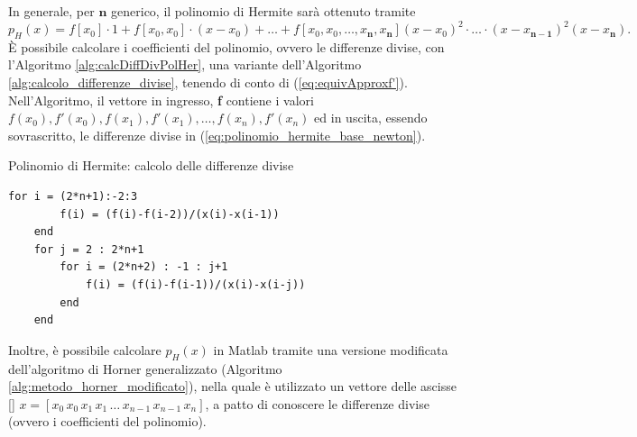 \begin{remark}
    In generale, per $\boldsymbol n$ generico, il polinomio di Hermite sarà ottenuto tramite 
    \begin{equation}\label{eq:polinomio_hermite_base_newton}
        p_H(x)=f[x_0]\cdot 1 + f[x_0,x_0]\cdot(x-x_0)+\hdots+f[x_0,x_0,\hdots,x_{\boldsymbol n},x_{\boldsymbol n}](x-x_0)^2\cdot\hdots\cdot(x-x_{\boldsymbol{n-1}})^2(x-x_{\boldsymbol n}).
    \end{equation}
    È possibile calcolare i coefficienti del polinomio, ovvero le differenze divise, con l'Algoritmo \ref{alg:calcDiffDivPolHer}, una variante dell'Algoritmo \ref{alg:calcolo_differenze_divise}, tenendo di conto di (\ref{eq:equivApproxf'}). Nell'Algoritmo, il vettore in ingresso, \textbf{f} contiene i valori $f(x_0), f'(x_0), f(x_1), f'(x_1),\hdots, f(x_n),f'(x_n)$ ed in uscita, essendo sovrascritto, le differenze divise in (\ref{eq:polinomio_hermite_base_newton}).
\end{remark}
\begin{algorithm}
\caption{Polinomio di Hermite: calcolo delle differenze divise}\label{alg:calcDiffDivPolHer}
    \begin{lstlisting}[style=Matlab-editor]
    for i = (2*n+1):-2:3
        f(i) = (f(i)-f(i-2))/(x(i)-x(i-1))
    end
    for j = 2 : 2*n+1
        for i = (2*n+2) : -1 : j+1
            f(i) = (f(i)-f(i-1))/(x(i)-x(i-j))
        end
    end
    \end{lstlisting}
\end{algorithm}

Inoltre, è possibile calcolare $p_H(x)$ in Matlab tramite una versione modificata dell'algoritmo di Horner generalizzato (Algoritmo \ref{alg:metodo_horner_modificato}), nella quale è utilizzato un vettore delle ascisse [\footnotemark] $x=[x_0\, x_0\, x_1\, x_1\, \hdots\, x_{n-1}\, x_{n-1}\,x_n]$, a patto di conoscere le differenze divise (ovvero i coefficienti del polinomio). 


